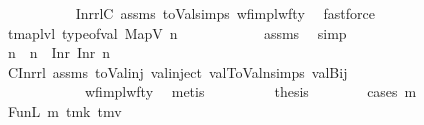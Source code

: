 \begin{isabellebody}
\ \ \ \ \ \ \ \ \isamarkupfalse%
\ {\isachardoublequoteopen}{}{\isachardoublequoteclose}\ InrrlC{}\ assms{\isacharparenleft}{\kern0pt}{}{\isacharparenright}{\kern0pt}\ toVal{}{}{}{}{\isachardot}{\kern0pt}simps{\isacharparenleft}{\kern0pt}{}{\isacharparenright}{\kern0pt}\ wf{\isacharunderscore}{\kern0pt}impl{\isacharunderscore}{\kern0pt}wf{\isacharunderscore}{\kern0pt}ty\ \isamarkupfalse%
\ fastforce\isanewline
\ \ \ \ \ \ \isamarkupfalse%
\ \isamarkupfalse%
\ {\isachardoublequoteopen}tmap{\isacharunderscore}{\kern0pt}lvl\ {\isacharparenleft}{\kern0pt}type{\isacharunderscore}{\kern0pt}of{\isacharunderscore}{\kern0pt}val\ {\isacharparenleft}{\kern0pt}MapV\ n{\isacharparenright}{\kern0pt}{\isacharparenright}{\kern0pt}\ {\isacharequal}{\kern0pt}\ {}{\isachardoublequoteclose}\isanewline
\ \ \ \ \ \ \ \ \isamarkupfalse%
\ assms{\isacharparenleft}{\kern0pt}{}{\isacharparenright}{\kern0pt}\ \isamarkupfalse%
\ simp\isanewline
\ \ \ \ \ \ \isamarkupfalse%
\ \isamarkupfalse%
\ n{\isacharprime}{\kern0pt}\ \ {\isachardoublequoteopen}n\ {\isacharequal}{\kern0pt}\ Inr\ {\isacharparenleft}{\kern0pt}Inr\ n{\isacharprime}{\kern0pt}{\isacharparenright}{\kern0pt}{\isachardoublequoteclose}\isanewline
\ \ \ \ \ \ \ \ \isamarkupfalse%
\ C{}Inrrl\ assms{\isacharparenleft}{\kern0pt}{}{\isacharparenright}{\kern0pt}\ toVal{}{}{}{}{\isacharunderscore}{\kern0pt}inj\ val{\isachardot}{\kern0pt}inject{\isacharparenleft}{\kern0pt}{}{\isacharparenright}{\kern0pt}\ val{}ToValn{\isachardot}{\kern0pt}simps{\isacharparenleft}{\kern0pt}{}{\isacharparenright}{\kern0pt}\ valBij\isanewline
\ \ \ \ \ \ \ \ \ \ \ \ wf{\isacharunderscore}{\kern0pt}impl{\isacharunderscore}{\kern0pt}wf{\isacharunderscore}{\kern0pt}ty\ \isamarkupfalse%
\ metis\isanewline
\ \ \ \ \ \ \isamarkupfalse%
\ \isamarkupfalse%
\ {\isacharquery}{\kern0pt}thesis\isanewline
\ \ \ \ \ \ \isamarkupfalse%
\ {\isacharparenleft}{\kern0pt}cases\ m{\isacharprime}{\kern0pt}{\isacharparenright}{\kern0pt}\isanewline
\ \ \ \ \ \ \ \ \isamarkupfalse%
\ {\isacharparenleft}{\kern0pt}FunL\ m{\isacharprime}{\kern0pt}{\isacharprime}{\kern0pt}\ tmk\ tmv{\isacharparenright}{\kern0pt}\isanewline

\end{isabellebody}
